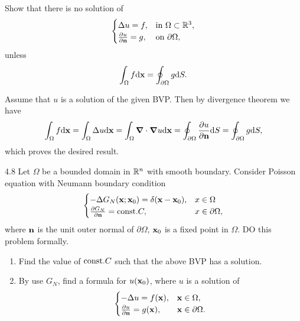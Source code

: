 \begin{question}{4.7}{}
    Show that there is no solution of
    \[
        \begin{cases}
            \Delta u=f, & \text{in $\Omega\subset\mathbb{R}^3$}, \\
            \pdv{u}{\vb{n}}=g, & \text{on $\partial\Omega$}, \\
        \end{cases}
    \]
    unless
    \[
        \int_\Omega f\dd\vb{x} = \oint_{\partial\Omega} g\dd S.
    \]
\end{question}
Assume that $u$ is a solution of the given BVP. Then by divergence theorem we have
\[
    \int_\Omega f\dd\vb{x} = \int_\Omega\Delta u\dd\vb{x} = \int_\Omega\grad\cdot\grad u\dd\vb{x} = \oint_{\partial\Omega} \pdv{u}{\vb{n}} \dd S = \oint_{\partial\Omega} g \dd S,
\]
which proves the desired result.


\begin{question}{4.8 }{}
    Let $\Omega$ be a bounded domain in $\mathbb{R}^n$ with smooth boundary. Consider Poisson equation with Neumann boundary condition
    \[
        \begin{cases}
            -\Delta G_N(\vb{x};\vb{x}_0) = \delta(\vb{x}-\vb{x}_0), & x\in\Omega \\
            \pdv{G_N}{\vb{n}}(\vb{x};\vb{x}_0) = \mathrm{const.} C, & x\in\partial\Omega,
        \end{cases}
    \]
    where $\vb{n}$ is the unit outer normal of $\partial\Omega$, $\vb{x}_0$ is a fixed point in $\Omega$. DO this problem formally.
    \begin{enumerate}[label=(\roman*)]
        \item Find the value of $\mathrm{const.} C$ such that the above BVP has a solution.
        \item By use $G_N$, find a formula for $u(\vb{x}_0)$, where $u$ is a solution of
            \[
                \begin{cases}
                    -\Delta u = f(\vb{x}), & \vb{x}\in\Omega, \\
                    \pdv{u}{\vb{n}} = g(\vb{x}), & \vb{x}\in\partial\Omega.
                \end{cases}
            \]
    \end{enumerate}
\end{question}


